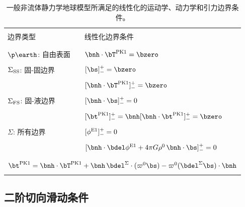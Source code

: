 \begin{table}[tb]
\label{table3.1}
\centering
\begin{tabular}{|l|l|} \hline
& \\
边界类型 & 线性化边界条件 \\
& \\ \hline
& \\
\index{boundary conditions!free surface}%
$\p\earth$: 自由表面 & $\bnh\cdot\bT^{\rm PK1}=\bzero$ \\
& \\
\index{boundary conditions!solid-solid}%
$\Sigma_{\rm SS}$: 固-固边界 & $[\bs]^+_-=\bzero$ \\
\vspace{-1.5 mm} & \vspace{-1.5 mm} \\
& $[\bnh\cdot\bT^{\rm PK1}]^+_-=\bzero$ \\
& \\
\index{boundary conditions!fluid-solid}%
$\Sigma_{\rm FS}$: 固-液边界 & $[\bnh\cdot\bs]^+_-=0$ \\
\vspace{-1.5 mm} & \vspace{-1.5 mm} \\
& $[\bt^{\rm PK1}]^+_-=\bnh[\bnh\cdot\bt^{\rm PK1}]^+_-=\bzero$ \\
& \\
$\Sigma$: 所有边界 & $[\phi^{\rm E1}]^+_-=0$ \\
\vspace{-1.5 mm} & \vspace{-1.5 mm} \\
& $[\bnh\cdot\bdel\phi^{\rm E1}+4\pi G\rho^0\,\bnh\cdot\bs]^+_-=0$ \\
& \\ \hline
\multicolumn{2}{|c|}{} \\
\multicolumn{2}{|c|}{$\bt^{\rm PK1}=\bnh\cdot\bT^{\rm PK1}
+\bnh\,\bdel^{\Sigma}\cdot(\varpi^0\bs)
-\varpi^0(\bdel^{\Sigma}\bs)\cdot\bnh$} \\
\multicolumn{2}{|c|}{} \\ \hline
\end{tabular}
\caption[bconds]{一般非流体静力学地球模型所满足的线性化的运动学、动力学和引力边界条件。}
\end{table}
%

\renewcommand{\thesubsection}{$\!\!\!\raise1.3ex\hbox{$\star$}\!\!$
\arabic{chapter}.\arabic{section}.\arabic{subsection}}
\subsection{二阶切向滑动条件}
%
\label{3.sec.slipbc}
\renewcommand{\thesubsection}{\arabic{chapter}.\arabic{section}.\arabic{subsection}}

